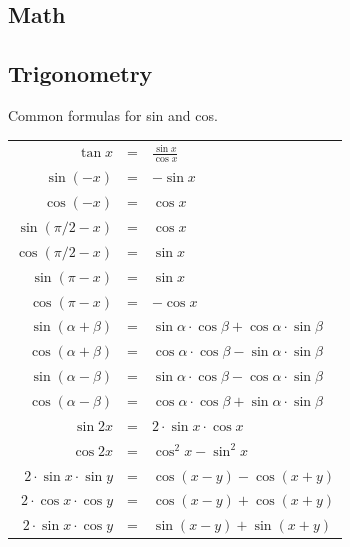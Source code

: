 \documentclass[8pt,a4paper,landscape,oneside]{amsart}
\begin{document}
\begin{multicols*}{3}
\thispagestyle{fancy}
\vspace{-3em}

\tableofcontents

\section{Math}
  \subsection{Trigonometry}
  Common formulas for sin and cos.
  \begin{center}
  \begin{tabular}{rcl}
  \hline
  $\tan x$ & = & $\frac{\sin x}{\cos x}$ \\
  $\sin(-x)$ & = & $-\sin x$ \\
  $\cos(-x)$ & = & $\cos x$ \\
  $\sin(\pi/2-x)$ & = & $\cos x$ \\
  $\cos(\pi/2-x)$ & = & $\sin x$ \\
  $\sin(\pi-x)$ & = & $\sin x$ \\
  $\cos(\pi-x)$ & = & $-\cos x$ \\
  \hline
  $\sin(\alpha+\beta)$ & = & $\sin\alpha \cdot \cos\beta + \cos\alpha \cdot \sin\beta$ \\
  $\cos(\alpha+\beta)$ & = & $\cos\alpha \cdot \cos\beta - \sin\alpha \cdot \sin\beta$ \\
  $\sin(\alpha-\beta)$ & = & $\sin\alpha \cdot \cos\beta - \cos\alpha \cdot \sin\beta$ \\
  $\cos(\alpha-\beta)$ & = & $\cos\alpha \cdot \cos\beta + \sin\alpha \cdot \sin\beta$ \\
  \hline
  $\sin 2x$ & = & $2 \cdot \sin x \cdot \cos x$ \\
  $\cos 2x$ & = & $\cos^2 x - \sin^2 x$ \\
  $2 \cdot \sin x \cdot \sin y$ & = & $\cos(x-y) - \cos(x+y)$ \\
  $2 \cdot \cos x \cdot \cos y$ & = & $\cos(x-y) + \cos(x+y)$ \\
  $2 \cdot \sin x \cdot \cos y$ & = & $\sin(x-y) + \sin(x+y)$ \\ \hline
  \end{tabular}
  \end{center}
  

\end{multicols*}
\end{document}
